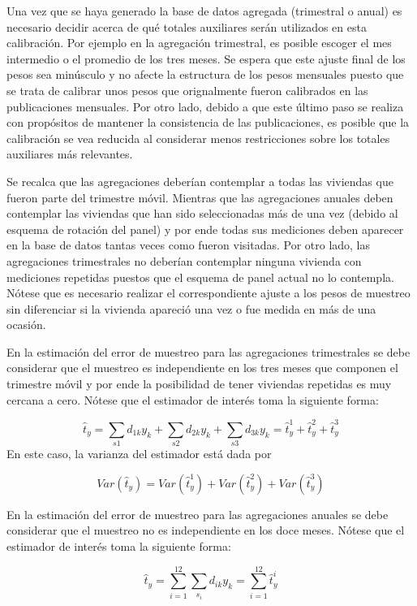 Una vez que se haya generado la base de datos agregada (trimestral o anual) es necesario decidir acerca de qué totales auxiliares serán utilizados en esta calibración. Por ejemplo en la agregación trimestral, es posible escoger el mes intermedio o el promedio de los tres meses. Se espera que este ajuste final de los pesos sea minúsculo y no afecte la estructura de los pesos mensuales puesto que se trata de calibrar unos pesos que orignalmente fueron calibrados en las publicaciones mensuales. Por otro lado, debido a que este último paso se realiza con propósitos de mantener la consistencia de las publicaciones, es posible que la calibración se vea reducida al considerar menos restricciones sobre los totales auxiliares más relevantes.

Se recalca que las agregaciones deberían contemplar a todas las viviendas que fueron parte del trimestre móvil. Mientras que las agregaciones anuales deben contemplar las viviendas que han sido seleccionadas más de una vez (debido al esquema de rotación del panel) y por ende todas sus mediciones deben aparecer en la base de datos tantas veces como fueron visitadas. Por otro lado, las agregaciones trimestrales no deberían contemplar ninguna vivienda con mediciones repetidas puestos que el esquema de panel actual no lo contempla. Nótese que es necesario realizar el correspondiente ajuste a los pesos de muestreo sin diferenciar si la vivienda apareció una vez o fue medida en más de una ocasión.

En la estimación del error de muestreo para las agregaciones trimestrales se debe considerar que el muestreo es independiente en los tres meses que componen el trimestre móvil y por ende la posibilidad de tener viviendas repetidas es muy cercana a cero. Nótese que el estimador de interés toma la siguiente forma:

\[
\hat{t}_y 
= \sum_{s1} d_{1k} y_k + \sum_{s2} d_{2k} y_k + \sum_{s3} d_{3k} y_k
= \hat{t}_{y}^1 + \hat{t}_{y}^2 + \hat{t}_{y}^3
\]
En este caso, la varianza del estimador está dada por

\[
Var(\hat{t}_y)
= Var(\hat{t}_{y}^1) + Var(\hat{t}_{y}^2) + Var(\hat{t}_{y}^3)
\]

En la estimación del error de muestreo para las agregaciones anuales se debe considerar que el muestreo no es independiente en los doce meses. Nótese que el estimador de interés toma la siguiente forma:

\[
\hat{t}_y 
= \sum_{i=1}^{12}\sum_{s_i} d_{ik} y_k 
= \sum_{i=1}^{12} \hat{t}_{y}^i
\]

